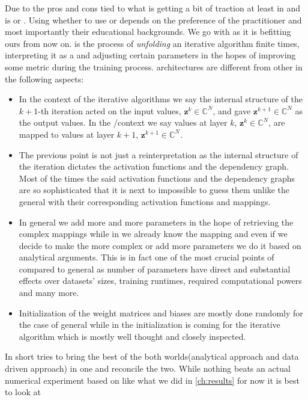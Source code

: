 Due to the pros and cons tied to \dl what is getting a bit of traction at least in \dsip and \cv is \du or \au. Using whether to use \du 
or \au depends on the preference of the practitioner and most importantly their educational backgrounds. We go with \du as it is befitting ours from now on.
\du is the process of \emph{unfolding} an iterative algorithm finite times, interpreting it as a \nn and 
adjusting certain parameters in the hopes of improving some metric during the training process. \DU architectures are 
different from other \nns in the following aspects:
\begin{itemize}
  \item In the context of the iterative algorithms we say the internal structure of the $k+1$-th iteration acted on the input values, $\boldsymbol{z}^k \in \mathbb{C}^N$, and gave $\boldsymbol{z}^{k+1} \in \mathbb{C}^N$ 
  as the output values. In the \ml/\dl context we say values at layer $k$, $\boldsymbol{z}^k \in \mathbb{C}^N$, are mapped to values at layer $k+1$, $\boldsymbol{z}^{k+1} \in \mathbb{C}^N$.
  \item The previous point is not just a reinterpretation as the internal structure of the iteration dictates the activation functions and the dependency graph. 
  Most of the times the said activation functions and the dependency graphs are so sophisticated that it is next to impossible to guess them unlike the general \nns 
  with their corresponding activation functions and mappings.
  \item In general \nns we add more and more parameters in the hope of retrieving the complex mappings while in \dl we already know the mapping 
  and even if we decide to make the \nn more complex or add more parameters we do it based on analytical arguments. This is in fact one of the most crucial points of 
  \dl compared to general \nns as number of parameters have direct and substantial effects over datasets'
   sizes, training runtimes, required computational powers and many more. 
  \item Initialization of the weight matrices and biases are mostly done randomly for the case of general \nns while in the \du initialization is coming for the 
  iterative algorithm which is mostly well thought and closely inspected.   
\end{itemize}
In short \du tries to bring the best of the both worlds(analytical approach and data driven approach) in one and reconcile the two. 
While nothing beats an actual numerical experiment based on \du like what we did in \cref{ch:results} for now it is best to look at 

